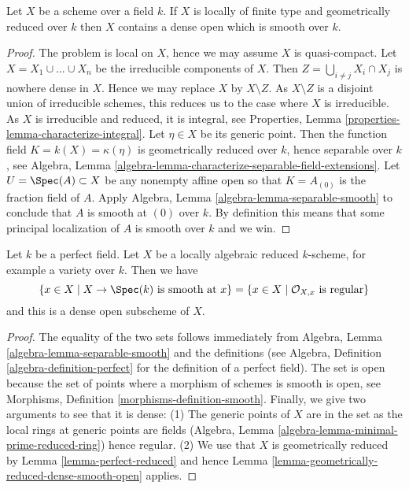 \begin{lemma}
\label{lemma-geometrically-reduced-dense-smooth-open}
Let $X$ be a scheme over a field $k$.
If $X$ is locally of finite type and geometrically reduced over $k$
then $X$ contains a dense open which is smooth over $k$.
\end{lemma}

\begin{proof}
The problem is local on $X$, hence we may assume $X$ is quasi-compact.
Let $X = X_1 \cup \ldots \cup X_n$ be the irreducible components of $X$.
Then $Z = \bigcup_{i \not = j} X_i \cap X_j$ is nowhere dense in $X$.
Hence we may replace $X$ by $X \setminus Z$. As $X \setminus Z$ is a
disjoint union of irreducible schemes, this reduces us to the case
where $X$ is irreducible. As $X$ is irreducible and reduced, it is
integral, see
Properties, Lemma \ref{properties-lemma-characterize-integral}.
Let $\eta \in X$ be its generic point.
Then the function field $K = k(X) = \kappa(\eta)$ is geometrically
reduced over $k$, hence separable over $k$, see
Algebra, Lemma \ref{algebra-lemma-characterize-separable-field-extensions}.
Let $U = \Spec(A) \subset X$ be any nonempty affine open
so that $K = A_{(0)}$ is the fraction field of $A$. Apply
Algebra, Lemma \ref{algebra-lemma-separable-smooth}
to conclude that $A$ is smooth at $(0)$ over $k$.
By definition this means that some principal localization
of $A$ is smooth over $k$ and we win.
\end{proof}

\begin{lemma}
\label{lemma-dense-smooth-open-variety-over-perfect-field}
Let $k$ be a perfect field. Let $X$ be a locally algebraic
reduced $k$-scheme, for example a variety over $k$. Then we have
$$
\{x \in X \mid X \to \Spec(k)\text{ is smooth at }x\} =
\{x \in X \mid \mathcal{O}_{X, x}\text{ is regular}\}
$$
and this is a dense open subscheme of $X$.
\end{lemma}

\begin{proof}
The equality of the two sets follows immediately from
Algebra, Lemma \ref{algebra-lemma-separable-smooth} and the definitions
(see Algebra, Definition \ref{algebra-definition-perfect} for the definition
of a perfect field). The set is open because the set of points where
a morphism of schemes is smooth is open, see
Morphisms, Definition \ref{morphisms-definition-smooth}.
Finally, we give two arguments to see that it is dense:
(1) The generic points of $X$ are in the set as the local rings at
generic points are fields (Algebra, Lemma
\ref{algebra-lemma-minimal-prime-reduced-ring}) hence regular.
(2) We use that $X$ is geometrically reduced by
Lemma \ref{lemma-perfect-reduced} and hence
Lemma \ref{lemma-geometrically-reduced-dense-smooth-open} applies.
\end{proof}

